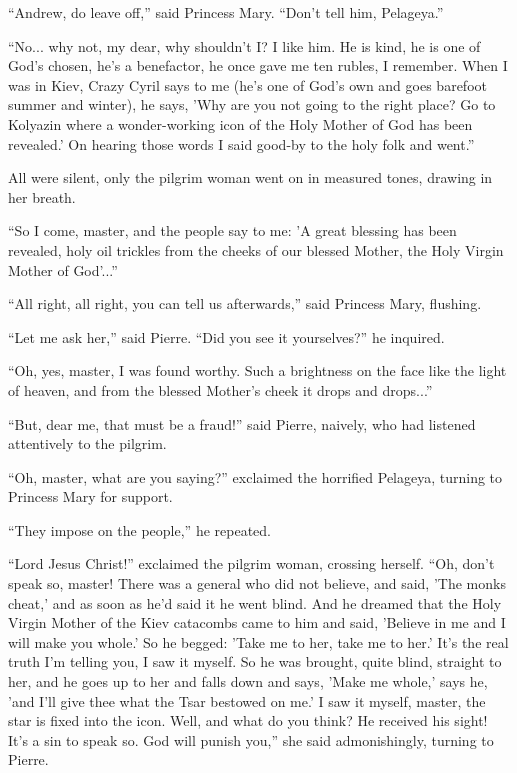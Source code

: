 ``Andrew, do leave off,'' said Princess Mary. ``Don't tell him,
Pelageya.''

``No... why not, my dear, why shouldn't I? I like him. He is
kind, he is one of God's chosen, he's a benefactor, he once gave
me ten rubles, I remember. When I was in Kiev, Crazy Cyril says
to me (he's one of God's own and goes barefoot summer and
winter), he says, 'Why are you not going to the right place? Go
to Kolyazin where a wonder-working icon of the Holy Mother of God
has been revealed.' On hearing those words I said good-by to the
holy folk and went.''

All were silent, only the pilgrim woman went on in measured
tones, drawing in her breath.

``So I come, master, and the people say to me: 'A great blessing
has been revealed, holy oil trickles from the cheeks of our
blessed Mother, the Holy Virgin Mother of God'...''

``All right, all right, you can tell us afterwards,'' said
Princess Mary, flushing.

``Let me ask her,'' said Pierre. ``Did you see it yourselves?''
he inquired.

``Oh, yes, master, I was found worthy. Such a brightness on the
face like the light of heaven, and from the blessed Mother's
cheek it drops and drops...''

``But, dear me, that must be a fraud!'' said Pierre, naively, who
had listened attentively to the pilgrim.

``Oh, master, what are you saying?'' exclaimed the horrified
Pelageya, turning to Princess Mary for support.

``They impose on the people,'' he repeated.

``Lord Jesus Christ!'' exclaimed the pilgrim woman, crossing
herself. ``Oh, don't speak so, master! There was a general who
did not believe, and said, 'The monks cheat,' and as soon as he'd
said it he went blind. And he dreamed that the Holy Virgin Mother
of the Kiev catacombs came to him and said, 'Believe in me and I
will make you whole.' So he begged: 'Take me to her, take me to
her.' It's the real truth I'm telling you, I saw it myself. So he
was brought, quite blind, straight to her, and he goes up to her
and falls down and says, 'Make me whole,' says he, 'and I'll give
thee what the Tsar bestowed on me.' I saw it myself, master, the
star is fixed into the icon. Well, and what do you think? He
received his sight! It's a sin to speak so. God will punish
you,'' she said admonishingly, turning to Pierre.

